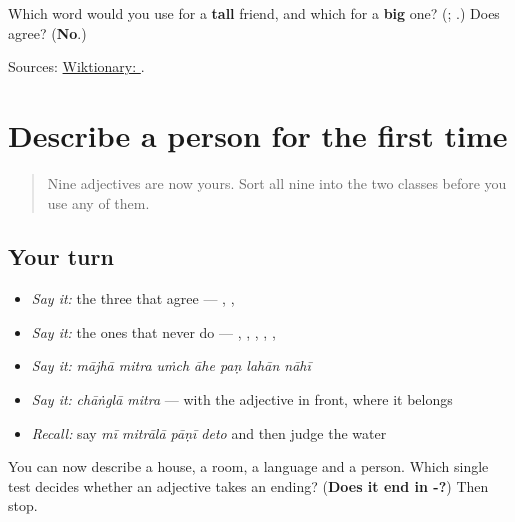 \begin{tcolorbox}[breakable,colback=teal!4,colframe=teal!35!black,title={Before you move on}]
Which word would you use for a \textbf{tall} friend, and which for a \textbf{big} one? (\textbf{}; \textbf{}.) Does \textbf{} agree? (\textbf{No}.)

Sources: \href{https://en.wiktionary.org/wiki/\%E0\%A4\%89\%E0\%A4\%82\%E0\%A4\%9A}{Wiktionary: }.
\end{tcolorbox}
\section[\texorpdfstring{\mr{सोपा} · \mr{कठीण} · \mr{उंच} (sopā · kaṭhīṇ · uṁch)}{सोपा · कठीण · उंच (sopā · kaṭhīṇ · uṁch)}]{Describe a person for the first time}

\label{lesson:MR-R52-easy-hard-tall}



\begin{quote}
Nine adjectives are now yours. Sort all nine into the two classes before you use any of them.
\end{quote}

\subsection*{Your turn}
\begin{itemize}
\raggedright
  \item \emph{Say it:} the three that agree — \emph{\textbf{}}, \emph{\textbf{}}, \emph{\textbf{}}
  \item \emph{Say it:} the ones that never do — \emph{\textbf{}}, \emph{\textbf{}}, \emph{\textbf{}}, \emph{\textbf{}}, \emph{\textbf{}}, \emph{\textbf{}}
  \item \emph{Say it:} \emph{mājhā mitra uṁch āhe paṇ lahān nāhī}
  \item \emph{Say it:} \emph{chāṅglā mitra} — with the adjective in front, where it belongs
  \item \emph{Recall:} say \emph{mī mitrālā pāṇī deto} and then judge the water
\end{itemize}

\begin{tcolorbox}[breakable,colback=teal!4,colframe=teal!35!black,title={Before you move on}]
You can now describe a house, a room, a language and a person. Which single test decides whether an adjective takes an ending? (\textbf{Does it end in -?}) Then stop.
\end{tcolorbox}
